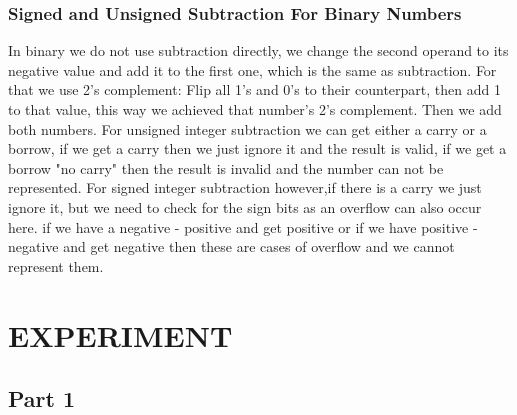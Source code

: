 \documentclass[pdftex,12pt,a4paper]{article}
\begin{document}
    \subsubsection{Signed and Unsigned Subtraction For Binary Numbers}
    In binary we do not use subtraction directly, we change the second operand to its negative value and add it to the first one, which is the same as subtraction. For that we use 2's complement: Flip all 1's and 0's to their counterpart, then add 1 to that value, this way we achieved that number's 2's complement. Then we add both numbers. For unsigned integer subtraction we can get either a carry or a borrow, if we get a carry then we just ignore it and the result is valid, if we get a borrow "no carry" then the result is invalid and the number can not be represented. For signed integer subtraction however,if there is a carry we just ignore it, but we need to check for the sign bits as an overflow can also occur here. if we have a negative - positive and get positive or if we have positive - negative and get negative then these are cases of overflow and we cannot represent them.
    
\section{EXPERIMENT}

\subsection{Part 1}
\end{document}

